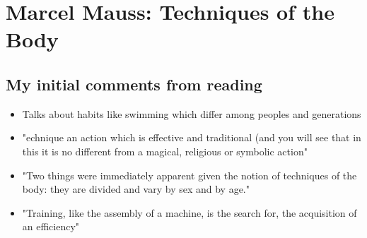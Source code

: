 \documentclass{article}
\begin{document}
\section{Marcel Mauss: Techniques of the Body}
\subsection{My initial comments from reading}
\begin{itemize}
\item Talks about habits like swimming which differ among peoples and generations
\item "echnique an action which is effective and traditional (and you will see that in this it is no different from a magical, religious or symbolic action"
\item "Two things were immediately apparent given the notion of techniques of the body: they are divided and vary by sex and by age."
\item "Training, like the assembly of a machine, is the search for, the acquisition of an efficiency"
\end{itemize}
\end{document}
